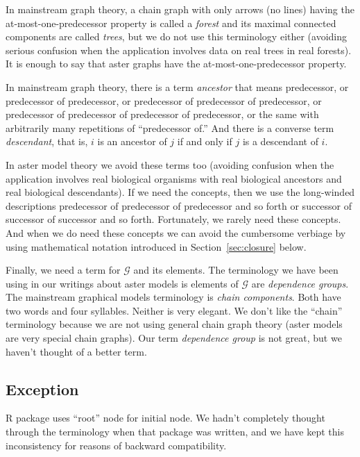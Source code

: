 In mainstream graph theory, a chain graph with only arrows (no lines) having
the at-most-one-predecessor property is called a \emph{forest} and its maximal
connected components are called \emph{trees}, but we do not use this terminology
either (avoiding serious confusion when the application involves data on
real trees in real forests).  It is enough to say that aster graphs
have the at-most-one-predecessor property.

In mainstream graph theory, there is a term \emph{ancestor} that means
predecessor, or predecessor of predecessor,
or predecessor of predecessor of predecessor,
or predecessor of predecessor of predecessor of predecessor,
or the same with arbitrarily many repetitions of ``predecessor of.''
And there is a converse term \emph{descendant}, that is, $i$ is an ancestor
of $j$ if and only if $j$ is a descendant of $i$.

In aster model theory we avoid these terms too (avoiding confusion when
the application involves real biological organisms with real biological
ancestors and real biological descendants).  If we need the concepts,
then we use the long-winded descriptions
predecessor of predecessor of predecessor and so forth or
successor of successor of successor and so forth.
Fortunately, we rarely need these concepts.
And when we do need these concepts we can avoid the cumbersome verbiage
by using mathematical notation introduced in Section~\ref{sec:closure}
below.

Finally, we need a term for $\mathcal{G}$ and its elements.
The terminology we have been using in our writings about aster models is
elements of $\mathcal{G}$ are \emph{dependence groups}.
The mainstream graphical models terminology \citep{lauritzen} is
\emph{chain components}.  Both have two words and four syllables.
Neither is very elegant.  We don't like the ``chain'' terminology because
we are not using general chain graph theory (aster models are very special
chain graphs).  Our term \emph{dependence group} is not great, but we haven't
thought of a better term.

\subsection{Exception}
\label{sec:exception-root}

R package  uses ``root'' node for initial node.
We hadn't completely thought through the terminology when that package
was written, and we have kept this inconsistency for reasons of backward
compatibility.

